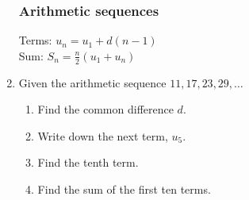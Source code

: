 \documentclass[12pt, twoside]{article}
\begin{document}
\begin{enumerate}
\begin{center}
  \end{center}

  \subsubsection*{Arithmetic sequences}
Terms: $u_n=u_1 + d(n-1)$\\[0.25cm]
Sum: $\displaystyle S_n= \frac{n}{2}(u_1 + u_n)$\\
  
\item Given the arithmetic sequence $11,17,23,29, \dots$
  \begin{enumerate}[itemsep=1cm]
    \item Find the common difference $d$.
    \item Write down the next term, $u_5$.
    \item Find the tenth term.\vspace{0.75cm}
    \item Find the sum of the first ten terms.
  \end{enumerate} \vspace{2cm}

  

\end{enumerate}
\end{document}
